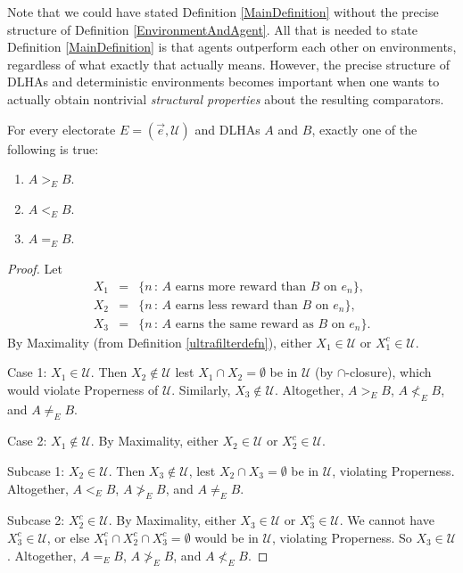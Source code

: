 \documentclass[twoside,11pt]{article}
\begin{document}
Note that we could have stated Definition \ref{MainDefinition} without the
precise structure of Definition \ref{EnvironmentAndAgent}.
All that is needed to state Definition \ref{MainDefinition} is that agents
outperform each other on environments, regardless of what exactly that actually means.
However, the precise structure of DLHAs and deterministic environments becomes
important when one
wants to actually obtain nontrivial \emph{structural properties} about the resulting
comparators.

\begin{lemma}
\label{firsteasylemma}
    For every electorate $E=(\vec{e},\mathscr U)$ and DLHAs $A$ and $B$, exactly one of the following is true:
    \begin{enumerate}
        \item $A>_{E}B$.
        \item $A<_{E}B$.
        \item $A=_{E}B$.
    \end{enumerate}
\end{lemma}

\begin{proof}
    Let
    \begin{eqnarray*}
        X_1 &=& \{n\,:\,\mbox{$A$ earns more reward than $B$ on $e_n$}\},\\
        X_2 &=& \{n\,:\,\mbox{$A$ earns less reward than $B$ on $e_n$}\},\\
        X_3 &=& \{n\,:\,\mbox{$A$ earns the same reward as $B$ on $e_n$}\}.
    \end{eqnarray*}
    By Maximality (from Definition \ref{ultrafilterdefn}),
    either $X_1\in \mathscr U$ or $X_1^c\in\mathscr U$.

    Case 1: $X_1\in\mathscr U$. Then $X_2\not\in\mathscr U$ lest $X_1\cap X_2=\emptyset$ be in
    $\mathscr U$ (by $\cap$-closure), which would violate Properness of $\mathscr U$.
    Similarly, $X_3\not\in\mathscr U$. Altogether, $A>_{E}B$,
    $A\not<_{E}B$, and $A\neq_{E}B$.

    Case 2: $X_1\not\in\mathscr U$.
    By Maximality, either $X_2\in\mathscr U$ or $X_2^c\in\mathscr U$.

    Subcase 1: $X_2\in\mathscr U$. Then $X_3\not\in\mathscr U$, lest $X_2\cap X_3=\emptyset$
    be in $\mathscr U$, violating Properness. Altogether, $A<_{E}B$,
    $A\not>_{E}B$, and $A\neq_{E}B$.

    Subcase 2: $X_2^c\in\mathscr U$. By Maximality, either $X_3\in\mathscr U$ or
    $X_3^c\in\mathscr U$. We cannot have $X_3^c\in\mathscr U$, or else
    $X_1^c\cap X_2^c\cap X_3^c=\emptyset$
    would be in $\mathscr U$, violating Properness. So $X_3\in\mathscr U$.
    Altogether, $A=_{E}B$, $A\not>_{E}B$, and $A\not<_{E}B$.
\end{proof}
\end{document}
